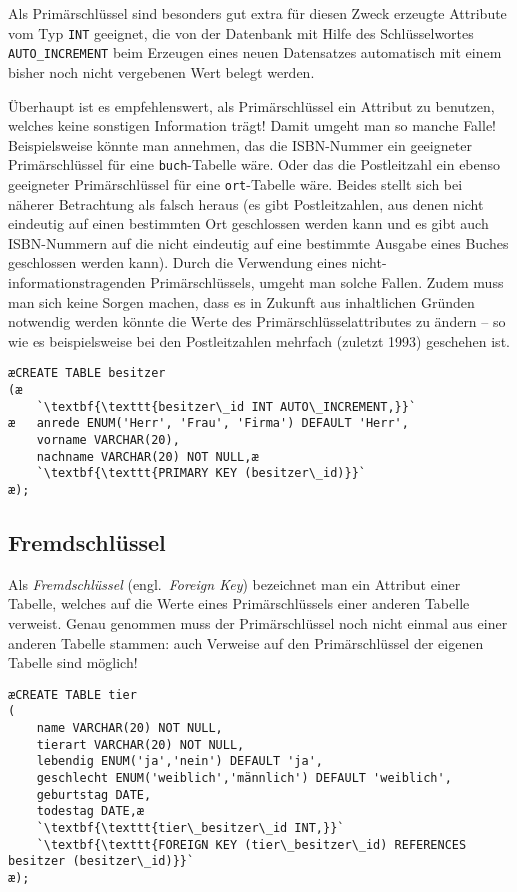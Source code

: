 Als Primärschlüssel sind besonders gut extra für diesen Zweck erzeugte Attribute
vom Typ \lstinline|INT| geeignet, die von der Datenbank mit Hilfe des
Schlüsselwortes \lstinline|AUTO_INCREMENT| beim Erzeugen eines neuen Datensatzes
automatisch mit einem bisher noch nicht vergebenen Wert belegt werden.

Überhaupt ist es empfehlenswert, als Primärschlüssel ein Attribut zu benutzen,
welches keine sonstigen Information trägt! Damit umgeht man so manche Falle!
Beispielsweise könnte man annehmen, das die ISBN-Nummer ein geeigneter
Primärschlüssel für eine \lstinline|buch|-Tabelle wäre. Oder das die
Postleitzahl ein ebenso geeigneter Primärschlüssel für eine
\lstinline|ort|-Tabelle wäre. Beides stellt sich bei näherer Betrachtung als
falsch heraus (es gibt Postleitzahlen, aus denen nicht eindeutig auf einen
bestimmten Ort geschlossen werden kann und es gibt auch ISBN-Nummern auf die
nicht eindeutig auf eine bestimmte Ausgabe eines Buches geschlossen werden
kann). Durch die Verwendung eines nicht-informationstragenden Primärschlüssels,
umgeht man solche Fallen. Zudem muss man sich keine Sorgen machen, dass es in
Zukunft aus inhaltlichen Gründen notwendig werden könnte die Werte des
Primärschlüsselattributes zu ändern -- so wie es beispielsweise bei den
Postleitzahlen mehrfach (zuletzt 1993) geschehen ist.

\begin{lstlisting}
æCREATE TABLE besitzer
(æ
	`\textbf{\texttt{besitzer\_id INT AUTO\_INCREMENT,}}`
æ	anrede ENUM('Herr', 'Frau', 'Firma') DEFAULT 'Herr',
	vorname VARCHAR(20),
	nachname VARCHAR(20) NOT NULL,æ
	`\textbf{\texttt{PRIMARY KEY (besitzer\_id)}}`
æ);
\end{lstlisting}


\subsection{Fremdschlüssel}

Als \emph{Fremdschlüssel} (engl.\ \emph{Foreign Key}) bezeichnet man ein
Attribut einer Tabelle, welches auf die Werte eines Primärschlüssels einer
anderen Tabelle verweist. Genau genommen muss der Primärschlüssel noch nicht
einmal aus einer anderen Tabelle stammen: auch Verweise auf den Primärschlüssel
der eigenen Tabelle sind möglich!

\begin{lstlisting}
æCREATE TABLE tier
(
	name VARCHAR(20) NOT NULL,
	tierart VARCHAR(20) NOT NULL,
	lebendig ENUM('ja','nein') DEFAULT 'ja',
	geschlecht ENUM('weiblich','männlich') DEFAULT 'weiblich',
	geburtstag DATE,
	todestag DATE,æ
	`\textbf{\texttt{tier\_besitzer\_id INT,}}`
	`\textbf{\texttt{FOREIGN KEY (tier\_besitzer\_id) REFERENCES besitzer (besitzer\_id)}}` 
æ);
\end{lstlisting}

